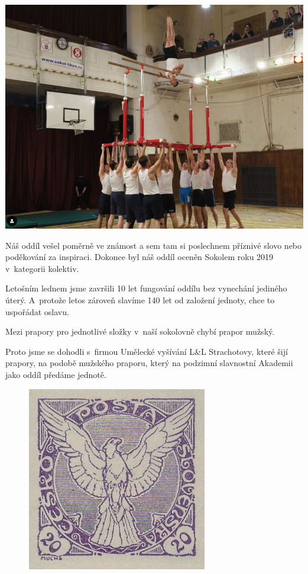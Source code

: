 \documentclass[11pt]{article}
\begin{document}
\begin{center}
  \includegraphics[width=0.8\linewidth]{./muzi_akademie.jpg}
\end{center}

Náš oddíl vešel poměrně ve známost a sem tam si poslechnem příznivé slovo nebo poděkování za inspiraci. Dokonce byl náš oddíl oceněn Sokolem roku 2019 v~kategorii kolektiv.

Letošním lednem jsme završili 10 let fungování oddílu bez vynechání jediného úterý. A~protože letos zároveň slavíme 140 let od založení jednoty, chce to uspořádat oslavu.

Mezi prapory pro jednotlivé složky v~naší sokolovně chybí prapor mužský.

Proto jsme se dohodli s~firmou Umělecké vyšívání L\&{}L Strachotovy, které šijí prapory, na podobě mužského praporu, který na podzimní slavnostní Akademii jako oddíl předáme jednotě.

\begin{figure}
  \includegraphics[width=0.9\linewidth]{./muzi_znamka.jpg}
\end{figure}
\end{document}
